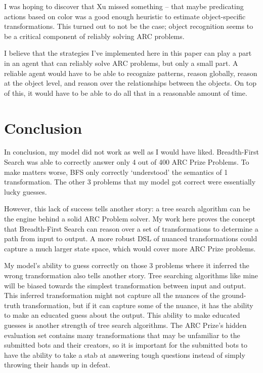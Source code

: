 \documentclass[letterpaper]{article} %
\begin{document}
\bigskip

I was hoping to discover that Xu missed something -- that maybe predicating actions based on color was a good enough heuristic to estimate object-specific transformations. This turned out to not be the case; object recognition seems to be a critical component of reliably solving ARC problems.

\bigskip

I believe that the strategies I've implemented here in this paper can play a part in an agent that can reliably solve ARC problems, but only a small part. A reliable agent would have to be able to recognize patterns, reason globally, reason at the object level, and reason over the relationships between the objects. On top of this, it would have to be able to do all that in a reasonable amount of time.

\section{Conclusion}
In conclusion, my model did not work as well as I would have liked. Breadth-First Search was able to correctly answer only 4 out of 400 ARC Prize Problems. To make matters worse, BFS only correctly `understood' the semantics of 1 transformation. The other 3 problems that my model got correct were essentially lucky guesses.

\bigskip

However, this lack of success tells another story: a tree search algorithm can be the engine behind a solid ARC Problem solver. My work here proves the concept that Breadth-First Search can reason over a set of transformations to determine a path from input to output. A more robust DSL of nuanced transformations could capture a much larger state space, which would cover more ARC Prize problems.

\bigskip

My model's ability to guess correctly on those 3 problems where it inferred the wrong transformation also tells another story. Tree searching algorithms like mine will be biased towards the simplest transformation between input and output. This inferred transformation might not capture all the nuances of the ground-truth transformation, but if it can capture some of the nuance, it has the ability to make an educated guess about the output. This ability to make educated guesses is another strength of tree search algorithms. The ARC Prize's hidden evaluation set contains many transformations that may be unfamiliar to the submitted bots and their creators, so it is important for the submitted bots to have the ability to take a stab at answering tough questions instead of simply throwing their hands up in defeat.
\end{document}
